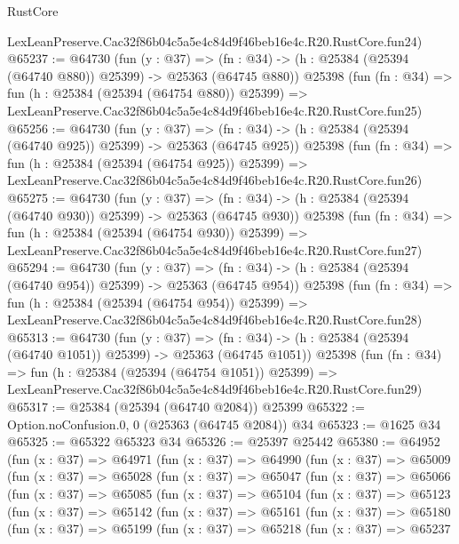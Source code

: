 \begin{lexlean}{RustCore}
\begin{coremodule}
    LexLeanPreserve.Cac32f86b04c5a5e4c84d9f46beb16e4c.R20.RustCore.fun24)
@65237 := @64730
    (fun (y : @37) =>
    (fn : @34) -> (h : @25384 (@25394 (@64740 @880)) @25399) -> @25363 (@64745 @880))
    @25398
    (fun (fn : @34) =>
    fun (h : @25384 (@25394 (@64754 @880)) @25399) =>
    LexLeanPreserve.Cac32f86b04c5a5e4c84d9f46beb16e4c.R20.RustCore.fun25)
@65256 := @64730
    (fun (y : @37) =>
    (fn : @34) -> (h : @25384 (@25394 (@64740 @925)) @25399) -> @25363 (@64745 @925))
    @25398
    (fun (fn : @34) =>
    fun (h : @25384 (@25394 (@64754 @925)) @25399) =>
    LexLeanPreserve.Cac32f86b04c5a5e4c84d9f46beb16e4c.R20.RustCore.fun26)
@65275 := @64730
    (fun (y : @37) =>
    (fn : @34) -> (h : @25384 (@25394 (@64740 @930)) @25399) -> @25363 (@64745 @930))
    @25398
    (fun (fn : @34) =>
    fun (h : @25384 (@25394 (@64754 @930)) @25399) =>
    LexLeanPreserve.Cac32f86b04c5a5e4c84d9f46beb16e4c.R20.RustCore.fun27)
@65294 := @64730
    (fun (y : @37) =>
    (fn : @34) -> (h : @25384 (@25394 (@64740 @954)) @25399) -> @25363 (@64745 @954))
    @25398
    (fun (fn : @34) =>
    fun (h : @25384 (@25394 (@64754 @954)) @25399) =>
    LexLeanPreserve.Cac32f86b04c5a5e4c84d9f46beb16e4c.R20.RustCore.fun28)
@65313 := @64730
    (fun (y : @37) =>
    (fn : @34) -> (h : @25384 (@25394 (@64740 @1051)) @25399) -> @25363 (@64745 @1051))
    @25398
    (fun (fn : @34) =>
    fun (h : @25384 (@25394 (@64754 @1051)) @25399) =>
    LexLeanPreserve.Cac32f86b04c5a5e4c84d9f46beb16e4c.R20.RustCore.fun29)
@65317 := @25384 (@25394 (@64740 @2084)) @25399
@65322 := Option.noConfusion.{0, 0} (@25363 (@64745 @2084)) @34
@65323 := @1625 @34
@65325 := @65322 @65323 @34
@65326 := @25397 @25442
@65380 := @64952
    (fun (x : @37) =>
    @64971
      (fun (x : @37) =>
      @64990
        (fun (x : @37) =>
        @65009
          (fun (x : @37) =>
          @65028
            (fun (x : @37) =>
            @65047
              (fun (x : @37) =>
              @65066
                (fun (x : @37) =>
                @65085
                  (fun (x : @37) =>
                  @65104
                    (fun (x : @37) =>
                    @65123
                      (fun (x : @37) =>
                      @65142
                        (fun (x : @37) =>
                        @65161
                          (fun (x : @37) =>
                          @65180
                            (fun (x : @37) =>
                            @65199
                              (fun (x : @37) =>
                              @65218
                                (fun (x : @37) =>
                                @65237

\end{coremodule}
\end{lexlean}
